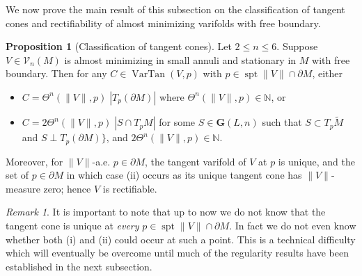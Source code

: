 \documentclass[10pt]{amsart}
\theoremstyle{definition}
\newtheorem{proposition}[theorem]{Proposition}
\theoremstyle{remark}
\newtheorem{remark}[theorem]{Remark}
\numberwithin{equation}{section}
\newcommand{\V}{\mathcal{V}}
\newcommand{\Gr}{\mathbf{G}}
\newcommand{\tM}{\widetilde{M}}
\newcommand{\VarTan}{\operatorname{VarTan}}
\newcommand{\spt}{\operatorname{spt}}
\begin{document}
We now prove the main result of this subsection on the classification of tangent cones and rectifiability of almost minimizing varifolds with free boundary.

\begin{proposition}[Classification of tangent cones]
\label{P:tangent-cone}
Let $2 \leq n \leq 6$. Suppose $V \in \V_n(M)$ is almost minimizing in small annuli and stationary in $M$ with free boundary. Then for any $C \in \VarTan(V,p)$ with $p \in \spt\|V\| \cap \partial M$, either 
\begin{itemize}
\item[(i)] $C=\Theta^n(\|V\|,p) \; |T_p(\partial M)|$ where $\Theta^n(\|V\|,p) \in \mathbb{N}$, or 
\item[(ii)] $C=2 \Theta^n (\|V\|,p) \; |S \cap T_pM|$ for some $S \in \Gr(L,n)$ such that $S \subset T_p \tM$ and $S \perp T_p (\partial M)\}$, and $2 \Theta^n(\|V\|,p) \in \mathbb{N}$.
\end{itemize}
Moreover, for $\|V\|$-a.e. $p \in \partial M$, the tangent varifold of $V$ at $p$ is unique, and the set of $p \in \partial M$ in which case (ii) occurs as its unique tangent cone has $\|V\|$-measure zero; hence $V$ is rectifiable.
\end{proposition}

\begin{remark}
It is important to note that up to now we do not know that the tangent cone is unique at \emph{every} $p \in \spt \|V\| \cap \partial M$. In fact we do not even know whether both (i) and (ii) could occur at such a point. This is a technical difficulty which will eventually be overcome until much of the regularity results have been established in the next subsection.
\end{remark}
\end{document}
